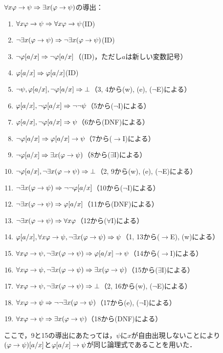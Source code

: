 \(\forall x \varphi \to \psi \sequent \exists x \paren{\varphi \to \psi}\)の導出：
\begin{enumerate}
	\item \(\forall x \varphi \to \psi \Rightarrow \forall x \varphi \to \psi\)\quad (ID)
	\item \(\lnot \exists x \paren{\varphi \to \psi} \sequent \lnot \exists x \paren{\varphi \to \psi}\)\quad (ID)
	\item \(\lnot \subst{\varphi}{a/x} \sequent \lnot \subst{\varphi}{a/x}\)\quad （(ID)，ただし\(a\)は新しい変数記号）
	\item \(\subst{\varphi}{a/x} \sequent \subst{\varphi}{a/x}\)\quad (ID)
	\item \(\lnot \psi, \subst{\varphi}{a/x}, \lnot \subst{\varphi}{a/x} \sequent \bot\)\quad （3, 4から(w), (e), (\(\lnot\)E)による）
	\item \(\subst{\varphi}{a/x}, \lnot \subst{\varphi}{a/x} \sequent \lnot \lnot \psi\)\quad （5から(\(\lnot\)I)による）
	\item \(\subst{\varphi}{a/x}, \lnot \subst{\varphi}{a/x} \sequent \psi\)\quad （6から(DNF)による）
	\item \(\lnot \subst{\varphi}{a/x} \sequent \subst{\varphi}{a/x} \to \psi\)\quad （7から(\(\to\)I)による）
	\item \(\lnot \subst{\varphi}{a/x} \sequent \exists x \paren{\varphi \to \psi}\)\quad （8から(\(\exists\)I)による）
	\item \(\lnot \subst{\varphi}{a/x}, \lnot \exists x \paren{\varphi \to \psi} \sequent \bot\)\quad （2, 9から(w), (e), (\(\lnot\)E)による）
	\item \(\lnot \exists x \paren{\varphi \to \psi} \sequent \lnot \lnot \subst{\varphi}{a/x}\)\quad （10から(\(\lnot\)I)による）
	\item \(\lnot \exists x \paren{\varphi \to \psi} \sequent \subst{\varphi}{a/x}\)\quad （11から(DNF)による）
	\item \(\lnot \exists x \paren{\varphi \to \psi} \sequent \forall x \varphi\)\quad （12から(\(\forall\)I)による）
	\item \(\subst{\varphi}{a/x}, \forall x \varphi \to \psi, \lnot \exists x \paren{\varphi \to \psi} \sequent \psi\)\quad （1, 13から(\(\to\)E), (w)による）
	\item \(\forall x \varphi \to \psi, \lnot \exists x \paren{\varphi \to \psi} \sequent \subst{\varphi}{a/x} \to \psi\)\quad （14から(\(\to\)I)による）
	\item \(\forall x \varphi \to \psi, \lnot \exists x \paren{\varphi \to \psi} \sequent \exists x \paren{\varphi \to \psi}\)\quad （15から(\(\exists\)I)による）
	\item \(\forall x \varphi \to \psi, \lnot \exists x \paren{\varphi \to \psi} \sequent \bot\)\quad （2, 16から(w), (\(\lnot\)E)による）
	\item \(\forall x \varphi \to \psi \sequent \lnot \lnot \exists x \paren{\varphi \to \psi}\)\quad （17から(e), (\(\lnot\)I)による）
	\item \(\forall x \varphi \to \psi \sequent \exists x \paren{\varphi \to \psi}\)\quad （18から(DNF)による）
\end{enumerate}
ここで，9と15の導出にあたっては，\(\psi\)に\(x\)が自由出現しないことにより
\(\subst{\paren{\varphi \to \psi}}{a/x}\)と\(\subst{\varphi}{a/x} \to \psi\)が同じ論理式であることを用いた．
